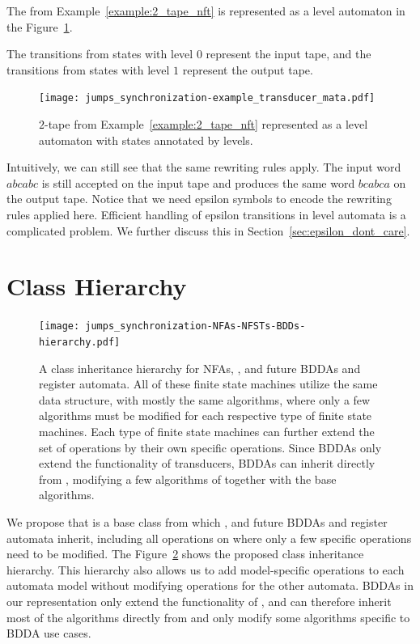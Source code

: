 \begin{example}\label{example:2_tape_nft_in_mata}
  The \nft from Example~\ref{example:2_tape_nft} is represented as a level automaton in the Figure~\ref{fig:2_tape_nft_in_mata}.

  The transitions from states with level $0$ represent the input tape, and the transitions from states with level $1$ represent the output tape.

  \begin{figure}[ht]
    \centering
    \texttt{[image: jumps\_synchronization-example\_transducer\_mata.pdf]}
    \caption{
      $2$-tape \nft from Example~\ref{example:2_tape_nft} represented as a level automaton with states annotated by levels.
    }\label{fig:2_tape_nft_in_mata}
  \end{figure}

  Intuitively, we can still see that the same rewriting rules apply.
  The input word $abcabc$ is still accepted on the input tape and produces the same word $bcabca$ on the output tape.
  Notice that we need epsilon symbols to encode the rewriting rules applied here.
  Efficient handling of epsilon transitions in level automata is a complicated problem.
  We further discuss this in Section~\ref{sec:epsilon_dont_care}.

\end{example}

\section{Class Hierarchy}
\label{sec:class_hierarchy}

\begin{figure}[ht]
  \centering
  \texttt{[image: jumps\_synchronization-NFAs-NFSTs-BDDs-hierarchy.pdf]}
  \caption{
    A class inheritance hierarchy for NFAs, \nfts, and future BDDAs and register automata.
    All of these finite state machines utilize the same data structure, with mostly the same algorithms, where only a few algorithms must be modified for each respective type of finite state machines.
    Each type of finite state machines can further extend the set of operations by their own specific operations.
    Since BDDAs only extend the functionality of transducers, BDDAs can inherit directly from \nfts, modifying a few algorithms of \nfts together with the base \nfaClass algorithms.
  }
  \label{fig:class_hierarchy}
\end{figure}


We propose that \nfaClass is a base class from which \nfts, and future BDDAs and register automata inherit, including all operations on \nfaClass where only a few specific operations need to be modified.
The Figure~\ref{fig:class_hierarchy} shows the proposed class inheritance hierarchy.
This hierarchy also allows us to add model-specific operations to each automata model without modifying operations for the other automata.
BDDAs in our representation only extend the functionality of \nfts, and can therefore inherit most of the algorithms directly from \nfts and only modify some algorithms specific to BDDA use cases.

